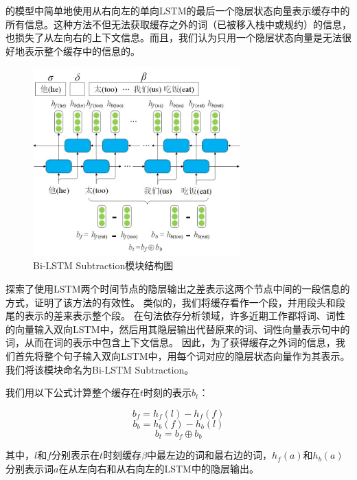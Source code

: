 的模型中简单地使用从右向左的单向LSTM的最后一个隐层状态向量表示缓存中的所有信息。这种方法不但无法获取缓存之外的词（已被移入栈中或规约）的信息，也损失了从左向右的上下文信息。而且，我们认为只用一个隐层状态向量是无法很好地表示整个缓存中的信息的。

\begin{figure}[hbtp]
	\centering
	\includegraphics[width=80mm]{picture/bs.jpg}
	\caption{Bi-LSTM Subtraction模块结构图}
	\label{fig:bs}
\end{figure}

探索了使用LSTM两个时间节点的隐层输出之差表示这两个节点中间的一段信息的方式，证明了该方法的有效性。
类似的，我们将缓存看作一个段，并用段头和段尾的表示的差来表示整个段。
在句法依存分析领域，许多近期工作都将词、词性的向量输入双向LSTM中，然后用其隐层输出代替原来的词、词性向量表示句中的词，从而在词的表示中包含上下文信息。
因此，为了获得缓存之外词的信息，我们首先将整个句子输入双向LSTM中，用每个词对应的隐层状态向量作为其表示。我们将该模块命名为Bi-LSTM Subtraction。

我们用以下公式计算整个缓存在$t$时刻的表示$b_t$：

\begin{equation}
b_f=h_f(l)-h_f(f)
\end{equation}
\begin{equation}
b_b=h_b(f)-h_b(l)
\end{equation}
\begin{equation}
b_t=b_f \oplus b_b
\end{equation}

其中，$l$和$f$分别表示在$t$时刻缓存$\beta$中最左边的词和最右边的词，$h_f(a)$和$h_b(a)$分别表示词$a$在从左向右和从右向左的LSTM中的隐层输出。

